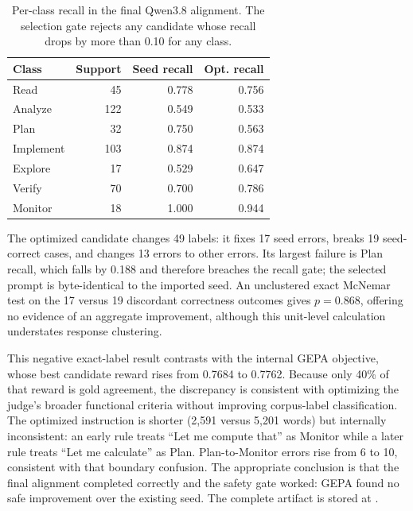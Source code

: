 \begin{table}[t]
\centering
\caption{Per-class recall in the final Qwen3.8 alignment.  The selection gate
rejects any candidate whose recall drops by more than 0.10 for any class.
}
\label{tab:exp0a-qwen38-classes}
\begin{tabular}{lrrr}
\toprule
Class & Support & Seed recall & Opt. recall \\
\midrule
Read      &  45 & 0.778 & 0.756 \\
Analyze   & 122 & 0.549 & 0.533 \\
Plan      &  32 & 0.750 & 0.563 \\
Implement & 103 & 0.874 & 0.874 \\
Explore   &  17 & 0.529 & 0.647 \\
Verify    &  70 & 0.700 & 0.786 \\
Monitor   &  18 & 1.000 & 0.944 \\
\bottomrule
\end{tabular}
\end{table}

The optimized candidate changes 49 labels: it fixes 17 seed errors, breaks 19
seed-correct cases, and changes 13 errors to other errors.  Its largest failure
is Plan recall, which falls by 0.188 and therefore breaches the recall gate;
the selected prompt is byte-identical to the imported seed.  An unclustered
exact McNemar test on the 17 versus 19 discordant correctness outcomes gives
$p=0.868$, offering no evidence of an aggregate improvement, although this
unit-level calculation understates response clustering.

This negative exact-label result contrasts with the internal GEPA objective,
whose best candidate reward rises from 0.7684 to 0.7762.  Because only 40\% of
that reward is gold agreement, the discrepancy is consistent with optimizing
the judge's broader functional criteria without improving corpus-label
classification.  The optimized instruction is shorter (2,591 versus 5,201
words) but internally inconsistent: an early rule treats ``Let me compute
that'' as Monitor while a later rule treats ``Let me calculate'' as Plan.
Plan-to-Monitor errors rise from 6 to 10, consistent with that boundary
confusion.  The appropriate conclusion is that the
final alignment completed correctly and the safety gate worked: GEPA found no
safe improvement over the existing seed.  The complete artifact is stored at
.


